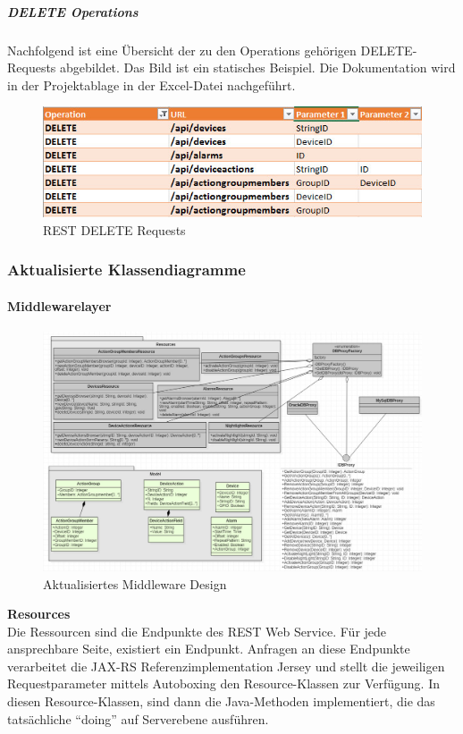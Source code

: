 \documentclass[]{article}
\let\oldparagraph\paragraph
\renewcommand{\paragraph}[1]{\oldparagraph{#1}\mbox{}}
\let\oldsubparagraph\subparagraph
\renewcommand{\subparagraph}[1]{\oldsubparagraph{#1}\mbox{}}
\begin{document}
\subparagraph{DELETE Operations}\label{delete-operations}

Nachfolgend ist eine Übersicht der zu den Operations gehörigen
DELETE-Requests abgebildet. Das Bild ist ein statisches Beispiel. Die
Dokumentation wird in der Projektablage in der Excel-Datei nachgeführt.
\begin{figure}[H]
\centering
\includegraphics{./WI27_WebService_Definition_DELETE.jpeg}
\caption{REST DELETE Requests}
\end{figure}


\subsubsection{Aktualisierte
Klassendiagramme}\label{aktualisierte-klassendiagramme}

\paragraph{Middlewarelayer}\label{middlewarelayer-1}

\begin{figure}[H]
\centering
\includegraphics{./WI60_Nachfuehren_Design_Middleware.jpeg}
\caption{Aktualisiertes Middleware Design}
\end{figure}

\textbf{Resources}\\
Die Ressourcen sind die Endpunkte des REST Web Service. Für jede
ansprechbare Seite, existiert ein Endpunkt. Anfragen an diese Endpunkte
verarbeitet die JAX-RS Referenzimplementation Jersey und stellt die
jeweiligen Requestparameter mittels Autoboxing den Resource-Klassen zur
Verfügung. In diesen Resource-Klassen, sind dann die Java-Methoden
implementiert, die das tatsächliche ``doing'' auf Serverebene ausführen.
\end{document}
